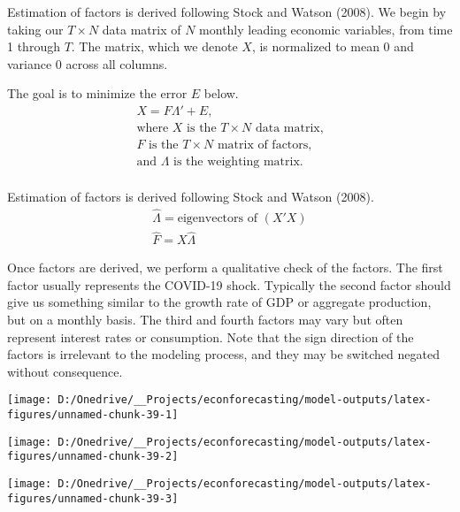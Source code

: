 \documentclass[11pt, letterpaper]{article}\usepackage[]{graphicx}\usepackage[]{color}
\begin{document}
Estimation of factors is derived following Stock and Watson (2008). We begin by taking our $T \times N$ data matrix of $N$ monthly leading economic variables, from time 1 through $T$. The matrix, which we denote $X$, is normalized to mean 0 and variance 0 across all columns.

The goal is to minimize the error $E$ below.
\begin{align*}
	X = F  \Lambda ' + E,\\
	\text{where $X$ is the $T \times N$ data matrix,}\\
	\text{$F$ is the $T \times N$ matrix of factors,}\\
	\text{and $\Lambda$ is the weighting matrix.}\\
\end{align*}

Estimation of factors is derived following Stock and Watson (2008).
\begin{align*}
	\widehat{\Lambda} = \text{eigenvectors of } (X'X)\\
	\widehat{F} = X \widehat{\Lambda}
\end{align*}

Once factors are derived, we perform a qualitative check of the factors. The first factor usually represents the COVID-19 shock. Typically the second factor should give us something similar to the growth rate of GDP or aggregate production, but on a monthly basis. The third and fourth factors may vary but often represent interest rates or consumption. Note that the sign direction of the factors is irrelevant to the modeling process, and they may be switched negated without consequence. 



{\centering \texttt{[image: D:/Onedrive/\_\_Projects/econforecasting/model-outputs/latex-figures/unnamed-chunk-39-1]} 

}




{\centering \texttt{[image: D:/Onedrive/\_\_Projects/econforecasting/model-outputs/latex-figures/unnamed-chunk-39-2]} 

}




{\centering \texttt{[image: D:/Onedrive/\_\_Projects/econforecasting/model-outputs/latex-figures/unnamed-chunk-39-3]} 

}
\end{document}
